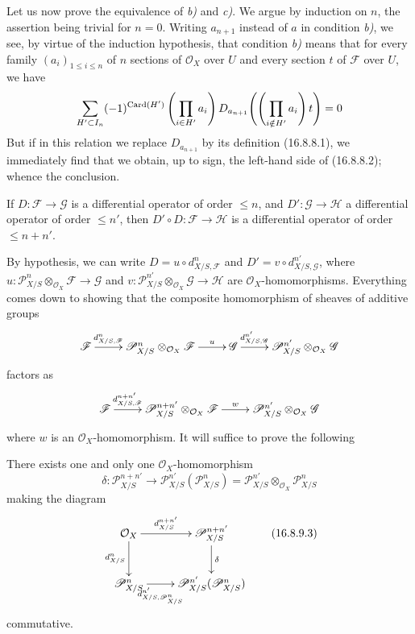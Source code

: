 Let us now prove the equivalence of \emph{b)} and \emph{c)}. We argue by induction on
$n$, the assertion being trivial for $n=0$. Writing $a_{n+1}$ instead of $a$
in condition \emph{b)}, we see, by virtue of the induction hypothesis, that
condition \emph{b)} means that for every family $(a_i)_{1\leq i\leq n}$ of $n$
sections of $\mathcal{O}_X$ over $U$ and every section $t$ of
$\mathscr{F}$ over $U$, we have
\[
  \sum_{H'\subset I_n}(- 1)^{\operatorname{Card}(H')}
  \left(\prod_{i\in H'}a_i\right)
  D_{a_{n+1}}\!\left(\left(\prod_{i\notin H'}a_i\right)t\right)=0
\]
But if in this relation we replace $D_{a_{n+1}}$ by its definition
(16.8.8.1), we immediately find that we obtain, up to sign, the left-hand
side of (16.8.8.2); whence the conclusion.

\begin{proposition}[16.8.9]
\label{IV.16.8.9}
If $D:\mathscr{F}\to\mathscr{G}$ is a differential operator of order
$\leq n$, and $D':\mathscr{G}\to\mathscr{H}$ a differential operator of order
$\leq n'$, then $D'\circ D:\mathscr{F}\to\mathscr{H}$ is a differential
operator of order $\leq n+n'$.
\end{proposition}

By hypothesis, we can write $D=u\circ d_{X/S,\mathscr{F}}^n$ and
$D'=v\circ d_{X/S,\mathscr{G}}^{n'}$, where
$u:\mathscr{P}_{X/S}^n\otimes_{\mathcal{O}_X}\mathscr{F}\to\mathscr{G}$ and
$v:\mathscr{P}_{X/S}^{n'}\otimes_{\mathcal{O}_X}\mathscr{G}\to\mathscr{H}$
are $\mathcal{O}_X$-homomorphisms. Everything comes down to showing that
the composite homomorphism of sheaves of additive groups
\[
  \xymatrix{
    \mathscr{F}\ar[r]^-{d_{X/S,\mathscr{F}}^n}
      &\mathscr{P}_{X/S}^n\otimes_{\mathcal{O}_X}\mathscr{F}
        \ar[r]^-u
      &\mathscr{G}\ar[r]^-{d_{X/S,\mathscr{G}}^{n'}}
      &\mathscr{P}_{X/S}^{n'}\otimes_{\mathcal{O}_X}\mathscr{G}
  }
\]
factors as
\[
  \xymatrix{
    \mathscr{F}\ar[r]^-{d_{X/S,\mathscr{F}}^{n+n'}}
      &\mathscr{P}_{X/S}^{n+n'}\otimes_{\mathcal{O}_X}\mathscr{F}
        \ar[r]^-w
      &\mathscr{P}_{X/S}^{n'}\otimes_{\mathcal{O}_X}\mathscr{G}
  }
\]
where $w$ is an $\mathcal{O}_X$-homomorphism. It will suffice to prove the
following

\begin{lemma}[16.8.9.1]
\label{IV.16.8.9.1}
There exists one and only one $\mathcal{O}_X$-homomorphism
\[
  \delta:\mathscr{P}_{X/S}^{n+n'}
  \longrightarrow
  \mathscr{P}_{X/S}^{n'}(\mathscr{P}_{X/S}^n)
  =\mathscr{P}_{X/S}^{n'}\otimes_{\mathcal{O}_X}\mathscr{P}_{X/S}^n
  \tag{16.8.9.2}
  \label{IV.16.8.9.2}
\]
making the diagram
\[
  \xymatrix{
    \mathcal{O}_X\ar[r]^-{d_{X/S}^{n+n'}}\ar[d]_-{d_{X/S}^n}
      &\mathscr{P}_{X/S}^{n+n'}\ar[d]^-\delta\\
    \mathscr{P}_{X/S}^n
      \ar[r]_-{d_{X/S,\mathscr{P}_{X/S}^n}^{n'}}
      &\mathscr{P}_{X/S}^{n'}(\mathscr{P}_{X/S}^n)
  }
  \tag{16.8.9.3}
  \label{IV.16.8.9.3}
\]
commutative.
\end{lemma}

